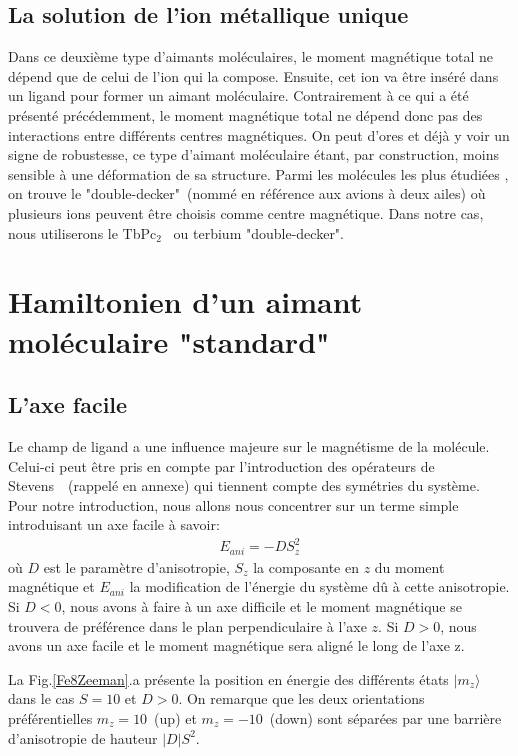 \subsection{La solution de l'ion métallique unique}
Dans ce deuxième type d'aimants moléculaires, le moment magnétique total ne dépend que de celui de l'ion qui la compose. Ensuite, cet ion va \^etre inséré dans un ligand pour former un aimant moléculaire. Contrairement à ce qui a été présenté précédemment, le moment magnétique total ne dépend donc pas des interactions entre différents centres magnétiques. On peut d'ores et déjà y voir un signe de robustesse, ce type d'aimant moléculaire étant, par construction, moins sensible à une déformation de sa structure. Parmi les molécules les plus étudiées , on trouve le "double-decker"~(nommé en référence aux avions à deux ailes) où plusieurs ions peuvent \^etre choisis comme centre magnétique. Dans notre cas, nous utiliserons le TbPc$_2$~\cite{Ishikawa2005} ou terbium "double-decker".



\section{Hamiltonien d'un aimant moléculaire "standard"}
\subsection{L'axe facile}
Le champ de ligand a une influence majeure sur le magnétisme de la molécule. Celui-ci peut \^etre pris en compte par l'introduction des opérateurs de Stevens~\cite{Stevens1952}~(rappelé en annexe) qui tiennent compte des symétries du système. Pour notre introduction, nous allons nous concentrer sur un terme simple introduisant un axe facile à savoir:
 \begin{eqnarray}
E_{ani} = -DS_z^2 \nonumber
\end{eqnarray}
où $D$ est le paramètre d'anisotropie, $S_z$ la composante en $z$ du moment magnétique et $E_{ani}$ la modification de l'énergie du système d\^u à cette anisotropie. Si $D<0$, nous avons à faire à un axe difficile et le moment magnétique se trouvera de préférence dans le plan perpendiculaire à l'axe $z$. Si $D>0$, nous avons un axe facile et le moment magnétique sera aligné le long de l'axe z.

La Fig.\ref{Fe8Zeeman}.a présente la position en énergie des différents états $|m_z \rangle$ dans le cas $S=10$ et $D>0$. On remarque que les deux orientations préférentielles $m_z=10$~(up) et $m_z=-10$~(down) sont séparées par une barrière d'anisotropie de hauteur $|D|S^2$.

